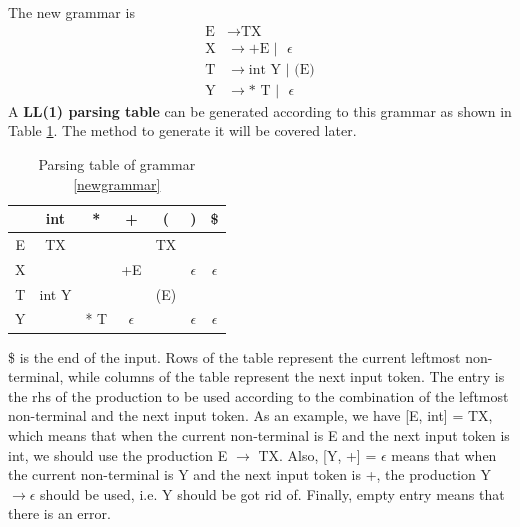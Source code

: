 The new grammar is 
\begin{equation}\label{newgrammar}\begin{split}
\text{E}&\rightarrow\text{TX}\\
\text{X}&\rightarrow\text{+E }|\text{ }\epsilon\\
\text{T}&\rightarrow\text{int Y }|\text{ (E)}\\
\text{Y}&\rightarrow\text{* T }|\text{ }\epsilon
\end{split}\end{equation}
A {\bf LL(1) parsing table} can be generated according to this grammar as shown in Table \ref{ll1table}. The method to generate it will be covered later.
\begin{table}[ht]
\centering
\caption{Parsing table of grammar \eqref{newgrammar}}\label{ll1table}
\begin{tabular}{|c|c|c|c|c|c|c|}
\hline
& int & * & + & ( & ) & \$ \\\hline
E & TX & && TX&&\\\hline
X & && +E & & $\epsilon$ & $\epsilon$\\\hline
T & int Y &&& (E)&&\\\hline
Y && * T & $\epsilon$  && $\epsilon$  & $\epsilon$ \\\hline
\end{tabular}
\end{table}
\$ is the end of the input. Rows of the table represent the current leftmost non-terminal, while columns of the table represent the next input token. The entry is the rhs of the production to be used according to the combination of the leftmost non-terminal and the next input token. As an example, we have [E, int] = TX, which means that when the current non-terminal is E and the next input token is int, we should use the production E $\rightarrow$ TX. Also, [Y, +] = $\epsilon$ means that when the current non-terminal is Y and the next input token is +, the production Y $\rightarrow \epsilon$ should be used, i.e. Y should be got rid of. Finally, empty entry means that there is an error.

